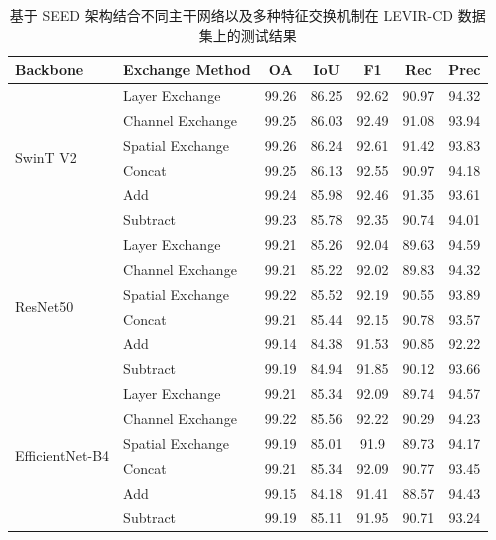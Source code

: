 \begin{table}[!htb]
\centering
\caption{基于 SEED 架构结合不同主干网络以及多种特征交换机制在 LEVIR-CD 数据集上的测试结果}
\label{tab:seed_levir_backbone}
\begin{tabular}{l l c c c c c}
\hline
\textbf{Backbone} & \textbf{Exchange Method} & \textbf{OA} & \textbf{IoU} & \textbf{F1} & \textbf{Rec} & \textbf{Prec} \\
\hline
\multirow{6}{*}{SwinT V2} 
 & Layer Exchange    & 99.26 & 86.25 & 92.62 & 90.97 & 94.32 \\
 & Channel Exchange  & 99.25 & 86.03 & 92.49 & 91.08 & 93.94 \\
 & Spatial Exchange  & 99.26 & 86.24 & 92.61 & 91.42 & 93.83 \\
\cline{2-7}
 & Concat            & 99.25 & 86.13 & 92.55 & 90.97 & 94.18 \\
 & Add               & 99.24 & 85.98 & 92.46 & 91.35 & 93.61 \\
 & Subtract             & 99.23 & 85.78 & 92.35 & 90.74 & 94.01 \\
\hline
\multirow{6}{*}{ResNet50} 
 & Layer Exchange    & 99.21 & 85.26 & 92.04 & 89.63 & 94.59 \\ 
 & Channel Exchange  & 99.21 & 85.22 & 92.02 & 89.83 & 94.32 \\
 & Spatial Exchange  & 99.22 & 85.52 & 92.19 & 90.55 & 93.89 \\    %
\cline{2-7}
 & Concat            & 99.21 & 85.44 & 92.15 & 90.78 & 93.57 \\    %
 & Add               & 99.14 & 84.38 & 91.53 & 90.85 & 92.22 \\
 & Subtract             & 99.19 & 84.94 & 91.85 & 90.12 & 93.66 \\
\hline
\multirow{6}{*}{EfficientNet-B4} 
 & Layer Exchange    & 99.21 & 85.34  & 92.09 & 89.74 & 94.57 \\
 & Channel Exchange  & 99.22 & 85.56	& 92.22	& 90.29	& 94.23 \\
 & Spatial Exchange  & 99.19 & 85.01	& 91.9	& 89.73	& 94.17 \\
\cline{2-7}
 & Concat            & 99.21	& 85.34	& 92.09	& 90.77	& 93.45 \\
 & Add               & 99.15	& 84.18	& 91.41	& 88.57	& 94.43 \\
 & Subtract             & 99.19	& 85.11	& 91.95	& 90.71	& 93.24 \\
\hline
\end{tabular}
\end{table}

